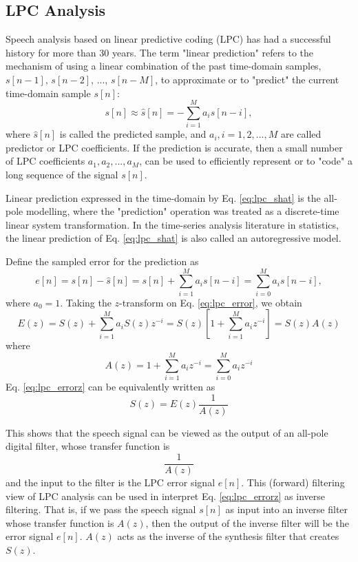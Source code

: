 \documentclass[12pt, a4paper, twoside]{report}
\begin{document}
\subsection{LPC Analysis}
Speech analysis based on linear predictive coding (LPC) has had a successful history for more than 30 years. The term "linear prediction" refers to the mechanism of using a linear combination of the past time-domain samples, $s[n-1]$, $s[n-2]$, ..., $s[n-M]$, to approximate or to "predict" the current time-domain sample $s[n]$:
\begin{equation} \label{eq:lpc_shat}
s[n]\approx \hat{s}[n] = -\sum_{i=1}^{M}a_i s[n-i],
\end{equation}
where $\hat{s}[n]$ is called the predicted sample, and $a_i, i = 1,2,...,M$ are called predictor or LPC coefficients. If the prediction is accurate, then a small number of LPC coefficients $a_1, a_2, ..., a_M$, can be used to efficiently represent or to "code" a long sequence of the signal $s[n]$. 

Linear prediction expressed in the time-domain by Eq. \ref{eq:lpc_shat} is the all-pole modelling, where the "prediction" operation was treated as a discrete-time linear system transformation. In the time-series analysis literature in statistics, the linear prediction of Eq. \ref{eq:lpc_shat} is also called an autoregressive model.

Define the sampled error for the prediction as
\begin{equation} \label{eq:lpc_error}
e[n] = s[n]-\hat{s}[n] = s[n] + \sum_{i=1}^{M}a_i s[n-i] = \sum_{i=0}^{M}a_i s[n-i],
\end{equation}
where $a_0 = 1$. Taking the $z$-transform on Eq. \ref{eq:lpc_error}, we obtain
\begin{equation} \label{eq:lpc_errorz}
E(z) = S(z) + \sum_{i=1}^{M} a_i S(z) z^{-i} = S(z)\left [ 1 + \sum_{i=1}^{M} a_i z^{-i} \right ] = S(z) A(z)
\end{equation}
where
\begin{equation} \label{eq:lpc_az}
A(z) = 1 + \sum_{i=1}^{M} a_i z^{-i} = \sum_{i=0}^{M} a_i z^{-i}
\end{equation}
Eq. \ref{eq:lpc_errorz} can be equivalently written as
\begin{equation} \label{eq:lpc_sz}
S(z) = E(z) \frac{1}{A(z)}
\end{equation}

This shows that the speech signal can be viewed as the output of an all-pole digital filter, whose transfer function is
\begin{equation} \label{eq:lpc_filter_tf}
\frac{1}{A(z)}
\end{equation}
and the input to the filter is the LPC error signal $e[n]$. This (forward) filtering view of LPC analysis can be used in interpret Eq. \ref{eq:lpc_errorz} as inverse filtering. That is, if we pass the speech signal $s[n]$ as input into an inverse filter whose transfer function is $A(z)$, then the output of the inverse filter will be the error signal $e[n]$. $A(z)$ acts as the inverse of the synthesis filter that creates $S(z)$.
\end{document}
